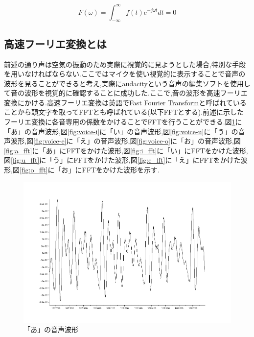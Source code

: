 \documentclass[12pt,oneside]{sotsuken_paper}
\begin{document}
\setcounter{equation}{0}
\begin{equation}
 F(ω)=\int^{\infty}_{-\infty} f(t)e^{-jωt}dt=0
\end{equation}
\label{eq:fu-rie}

\subsection{高速フーリエ変換とは}
前述の通り声は空気の振動のため実際に視覚的に見ようとした場合,特別な手段を用いなければならない.ここではマイクを使い視覚的に表示することで音声の波形を見ることができると考え,実際にaudacityという音声の編集ソフトを使用して音の波形を視覚的に確認することに成功した.ここで,音の波形を高速フーリエ変換にかける.高速フーリエ変換は英語でFast Fourier Transformと呼ばれていることから頭文字を取ってFFTとも呼ばれている(以下FFTとする).前述に示したフーリエ変換に各音専用の係数をかけることでFFTを行うことができる.図\ref{fig:voice-a}に「あ」の音声波形,図\ref{fig:voice-i}に「い」の音声波形,図\ref{fig:voice-u}に「う」の音声波形,図\ref{fig:voice-e}に「え」の音声波形,図\ref{fig:voice-o}に「お」の音声波形,図\ref{fig:a_fft}に「あ」にFFTをかけた波形,図\ref{fig:i_fft}に「い」にFFTをかけた波形,図\ref{fig:u_fft}に「う」にFFTをかけた波形,図\ref{fig:e_fft}に「え」にFFTをかけた波形,図\ref{fig:o_fft}に「お」にFFTをかけた波形を示す.


\begin{figure}[htbp]
\begin{center}
\includegraphics[width=120mm]{img/a.png}
\caption{「あ」の音声波形}
\label{fig:voice-a}
\end{center}
\end{figure}
\end{document}
